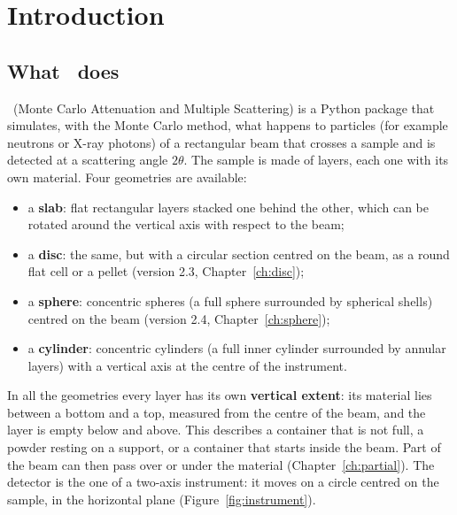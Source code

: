 \chapter{Introduction}
\label{ch:intro}

\section{What \mcams\ does}

\mcams\ (Monte Carlo Attenuation and Multiple Scattering) is a Python package that simulates, with the Monte Carlo method, what happens to particles
(for example neutrons or X-ray photons) of a rectangular beam that crosses a
sample and is detected at a scattering angle $2\theta$. The sample is made of
layers, each one with its own material. Four geometries are available:
\begin{itemize}
  \item a \textbf{slab}: flat rectangular layers stacked one behind the other, which can be rotated
        around the vertical axis with respect to the beam;
  \item a \textbf{disc}: the same, but with a circular section centred on the beam, as a round flat cell or a pellet
        (version 2.3, Chapter~\ref{ch:disc});
  \item a \textbf{sphere}: concentric spheres (a full sphere surrounded by spherical shells) centred on the beam
        (version 2.4, Chapter~\ref{ch:sphere});
  \item a \textbf{cylinder}: concentric cylinders (a full inner cylinder surrounded by
        annular layers) with a vertical axis at the centre of the instrument.
\end{itemize}
In all the geometries every layer has its own \textbf{vertical extent}: its material lies between a bottom and a
top, measured from the centre of the beam, and the layer is empty below and above. This describes a container
that is not full, a powder resting on a support, or a container that starts inside the beam. Part of the beam
can then pass over or under the material (Chapter~\ref{ch:partial}).
The detector is the one of a two-axis instrument: it moves on a circle centred on
the sample, in the horizontal plane (Figure~\ref{fig:instrument}).

